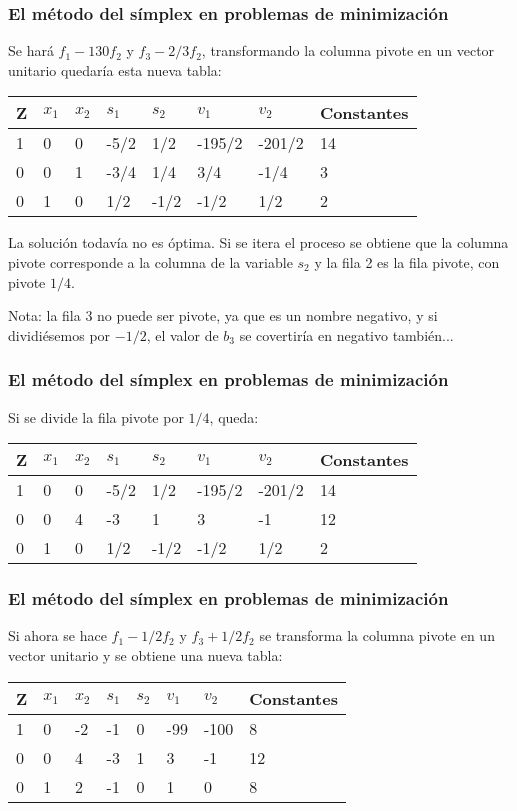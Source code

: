 \documentclass{beamer}
\begin{document}
\begin{frame}
\frametitle{El m\'etodo del s\'implex en problemas de minimizaci\'on}
Se har\'a $f_1-130f_2$ y $f_3-2/3f_2$, transformando la columna pivote en un vector unitario quedar\'ia esta nueva tabla:

\begin{tabular}{ |p{0.6cm}||p{0.8cm}|p{0.8cm}|p{0.8cm}|p{0.8cm}|p{1.2cm}|p{1.2cm}|p{1.6cm}|  }
 \hline
 Z & $x_1$ & $x_2$ & $s_1$& $s_2$ & $v_1$  & $v_2$& Constantes \\
 \hline
1 &0 & 0 & -5/2 & 1/2& -195/2& -201/2 & 14 \\
0 & 0 &  1 & -3/4 & 1/4 & 3/4 & -1/4 & 3 \\
0 & 1 & 0 & 1/2 & -1/2 & -1/2 & 1/2  & 2 \\
 \hline
\end{tabular}
La soluci\'on todav\'ia no es \'optima. Si se itera el proceso se obtiene que la columna pivote corresponde a la columna de la variable $s_2$ y la fila 2 es la fila pivote, con pivote $1/4$. 

Nota: la fila 3 no puede ser pivote, ya que es un nombre negativo, y si dividi\'esemos por $-1/2$, el valor de $b_3$ se covertir\'ia en negativo tambi\'en...
\end{frame}


\begin{frame}
\frametitle{El m\'etodo del s\'implex en problemas de minimizaci\'on}
Si se divide la fila pivote por $1/4$, queda:
\begin{tabular}{ |p{0.6cm}||p{0.8cm}|p{0.8cm}|p{0.8cm}|p{0.8cm}|p{1.2cm}|p{1.2cm}|p{1.6cm}|  }
 \hline
 Z & $x_1$ & $x_2$ & $s_1$& $s_2$ & $v_1$  & $v_2$& Constantes \\
 \hline
1 &0 & 0 & -5/2 & 1/2& -195/2& -201/2 & 14 \\
0 & 0 &  4 & -3 & 1 & 3 & -1 & 12 \\
0 & 1 & 0 & 1/2 & -1/2 & -1/2 & 1/2  & 2 \\
 \hline
\end{tabular}
\end{frame}


\begin{frame}
\frametitle{El m\'etodo del s\'implex en problemas de minimizaci\'on}
Si ahora se hace $f_1-1/2f_2$ y $f_3+1/2f_2$ se transforma la columna pivote en un vector unitario y se obtiene una nueva tabla:
\begin{tabular}{ |p{0.6cm}||p{0.8cm}|p{0.8cm}|p{0.8cm}|p{0.8cm}|p{1.2cm}|p{1.2cm}|p{1.6cm}|  }
 \hline
 Z & $x_1$ & $x_2$ & $s_1$& $s_2$ & $v_1$  & $v_2$& Constantes \\
 \hline
1 &0 & -2 & -1 & 0& -99& -100 & 8 \\
0 & 0 &  4 & -3 & 1 & 3 & -1 & 12 \\
0 & 1 & 2 & -1 & 0 & 1 & 0  & 8 \\
 \hline
\end{tabular}
\end{frame}
\end{document}
